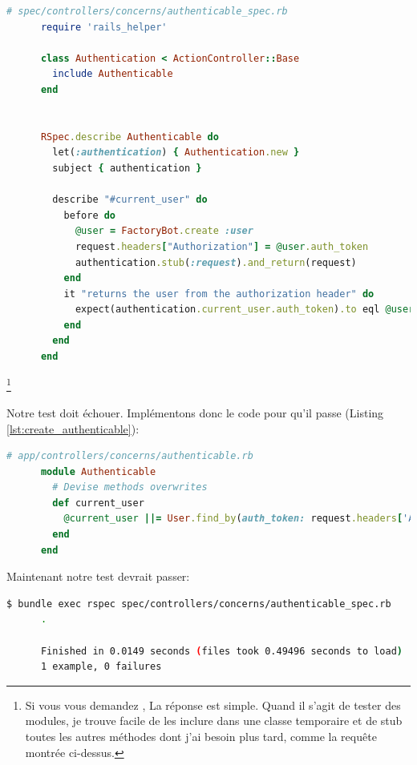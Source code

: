 \documentclass[]{report}
\begin{document}
    \begin{scriptsize}
      \begin{lstlisting}[language=ruby]
      # spec/controllers/concerns/authenticable_spec.rb
      require 'rails_helper'

      class Authentication < ActionController::Base
        include Authenticable
      end


      RSpec.describe Authenticable do
        let(:authentication) { Authentication.new }
        subject { authentication }

        describe "#current_user" do
          before do
            @user = FactoryBot.create :user
            request.headers["Authorization"] = @user.auth_token
            authentication.stub(:request).and_return(request)
          end
          it "returns the user from the authorization header" do
            expect(authentication.current_user.auth_token).to eql @user.auth_token
          end
        end
      end
      \end{lstlisting}
    \end{scriptsize}
    \footnote{Si vous vous demandez , La réponse est simple. Quand il s'agit de tester des modules, je trouve facile de les inclure dans une classe temporaire et de stub toutes les autres méthodes dont j'ai besoin plus tard, comme la requête montrée ci-dessus.}

    Notre test doit échouer. Implémentons donc le code pour qu'il passe (Listing \ref{lst:create_authenticable}):

    \begin{scriptsize}
      \begin{lstlisting}[language=ruby, caption={Implémentation de la méthode current\_user}, label={lst:create_authenticable}]
      # app/controllers/concerns/authenticable.rb
      module Authenticable
        # Devise methods overwrites
        def current_user
          @current_user ||= User.find_by(auth_token: request.headers['Authorization'])
        end
      end
      \end{lstlisting}
    \end{scriptsize}

    Maintenant notre test devrait passer:

    \begin{scriptsize}
      \begin{lstlisting}[language=bash]
      $ bundle exec rspec spec/controllers/concerns/authenticable_spec.rb
      .

      Finished in 0.0149 seconds (files took 0.49496 seconds to load)
      1 example, 0 failures
      \end{lstlisting}
    \end{scriptsize}
\end{document}

